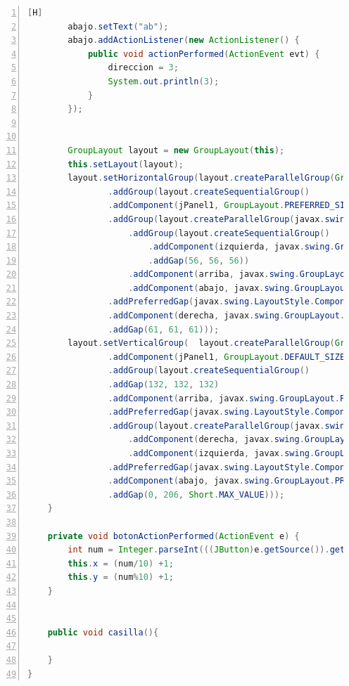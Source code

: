 \documentclass{article}
\begin{document}
\begin{lstlisting}[language=Java,caption={Creando la interfaz de tablero},numbers=left,][H]
        abajo.setText("ab");
        abajo.addActionListener(new ActionListener() {
            public void actionPerformed(ActionEvent evt) {
                direccion = 3;
                System.out.println(3);
            }
        });


        GroupLayout layout = new GroupLayout(this);
        this.setLayout(layout);
        layout.setHorizontalGroup(layout.createParallelGroup(GroupLayout.Alignment.LEADING)
                .addGroup(layout.createSequentialGroup()
                .addComponent(jPanel1, GroupLayout.PREFERRED_SIZE, 500, GroupLayout.PREFERRED_SIZE)                .addPreferredGap(javax.swing.LayoutStyle.ComponentPlacement.RELATED, 77, Short.MAX_VALUE)
                .addGroup(layout.createParallelGroup(javax.swing.GroupLayout.Alignment.TRAILING)
                    .addGroup(layout.createSequentialGroup()
                        .addComponent(izquierda, javax.swing.GroupLayout.PREFERRED_SIZE, 50, javax.swing.GroupLayout.PREFERRED_SIZE)
                        .addGap(56, 56, 56))
                    .addComponent(arriba, javax.swing.GroupLayout.PREFERRED_SIZE, 50, javax.swing.GroupLayout.PREFERRED_SIZE)
                    .addComponent(abajo, javax.swing.GroupLayout.PREFERRED_SIZE, 50, javax.swing.GroupLayout.PREFERRED_SIZE))
                .addPreferredGap(javax.swing.LayoutStyle.ComponentPlacement.RELATED)
                .addComponent(derecha, javax.swing.GroupLayout.PREFERRED_SIZE, 50, javax.swing.GroupLayout.PREFERRED_SIZE)
                .addGap(61, 61, 61)));
        layout.setVerticalGroup(  layout.createParallelGroup(GroupLayout.Alignment.LEADING)
                .addComponent(jPanel1, GroupLayout.DEFAULT_SIZE, 500, Short.MAX_VALUE)
                .addGroup(layout.createSequentialGroup()
                .addGap(132, 132, 132)
                .addComponent(arriba, javax.swing.GroupLayout.PREFERRED_SIZE, 50, javax.swing.GroupLayout.PREFERRED_SIZE)
                .addPreferredGap(javax.swing.LayoutStyle.ComponentPlacement.RELATED)
                .addGroup(layout.createParallelGroup(javax.swing.GroupLayout.Alignment.BASELINE)
                    .addComponent(derecha, javax.swing.GroupLayout.PREFERRED_SIZE, 50, javax.swing.GroupLayout.PREFERRED_SIZE)
                    .addComponent(izquierda, javax.swing.GroupLayout.PREFERRED_SIZE, 50, javax.swing.GroupLayout.PREFERRED_SIZE))
                .addPreferredGap(javax.swing.LayoutStyle.ComponentPlacement.RELATED)
                .addComponent(abajo, javax.swing.GroupLayout.PREFERRED_SIZE, 50, javax.swing.GroupLayout.PREFERRED_SIZE)
                .addGap(0, 206, Short.MAX_VALUE)));
    }

    private void botonActionPerformed(ActionEvent e) {
        int num = Integer.parseInt(((JButton)e.getSource()).getName());
        this.x = (num/10) +1;
        this.y = (num%10) +1;
    }


    public void casilla(){
        
    }
}
\end{lstlisting}
	
\end{document}

